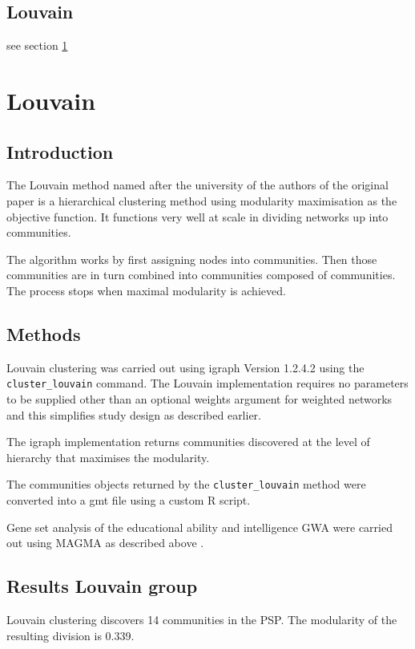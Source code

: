 \subsection{Louvain}
see section \ref{sec:Louvain}

\section{Louvain}
\label{sec:Louvain}

\subsection{Introduction}
The Louvain method named after the university of the authors of the original paper is a hierarchical clustering method using modularity maximisation as the objective function. It functions very well at scale in dividing networks up into communities.\cite{blondel2008fast}

The algorithm works by first assigning nodes into communities. Then those communities are in turn combined into communities composed of communities. The process stops when maximal modularity is achieved. 

\subsection{Methods}

Louvain clustering was carried out using igraph Version 1.2.4.2 using the \texttt{cluster\_louvain} command. The Louvain implementation requires no parameters to be supplied other than an optional weights argument for weighted networks and this simplifies study design as described earlier. 

The igraph implementation returns communities discovered at the level of hierarchy that maximises the modularity.

The communities objects returned by the \texttt{cluster\_louvain} method were converted into a gmt file using a custom R script.

Gene set analysis of the educational ability and intelligence GWA were carried out using MAGMA as described above . 
\cite{blondel2008fast}
\subsection{Results Louvain group}
Louvain clustering discovers 14 communities in the PSP. The modularity of the resulting division is 0.339. 

